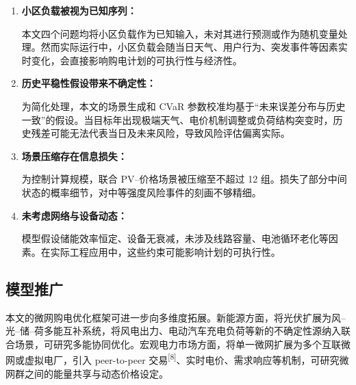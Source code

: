 \documentclass[withoutpreface,bwprint]{cumcmthesis} %
\begin{document}
\begin{enumerate}
    \item \textbf{小区负载被视为已知序列：}
    
    \hspace{2em}本文四个问题均将小区负载作为已知输入，未对其进行预测或作为随机变量处理。然而实际运行中，小区负载会随当日天气、用户行为、突发事件等因素实时变化，会直接影响购电计划的可执行性与经济性。

    \item \textbf{历史平稳性假设带来不确定性：}
    
    \hspace{2em}为简化处理，本文的场景生成和 CVaR 参数校准均基于“未来误差分布与历史一致”的假设。当目标年出现极端天气、电价机制调整或负荷结构突变时，历史残差可能无法代表当日及未来风险，导致风险评估偏离实际。

    \item \textbf{场景压缩存在信息损失：}
    
    \hspace{2em}为控制计算规模，联合 PV--价格场景被压缩至不超过 12 组。损失了部分中间状态的概率细节，对中等强度风险事件的刻画不够精细。

    \item \textbf{未考虑网络与设备动态：}
    
    \hspace{2em}模型假设储能效率恒定、设备无衰减，未涉及线路容量、电池循环老化等因素。在实际工程应用中，这些约束可能影响计划的可执行性。
    
\end{enumerate}


\subsection{模型推广}

本文的微网购电优化框架可进一步向多维度拓展。新能源方面，将光伏扩展为风--光--储--荷多能互补系统，将风电出力、电动汽车充电负荷等新的不确定性源纳入联合场景，可研究多能协同优化。宏观电力市场方面，将单一微网扩展为多个互联微网或虚拟电厂，引入 peer-to-peer 交易\textsuperscript{[8]}、实时电价、需求响应等机制，可研究微网群之间的能量共享与动态价格设定。






\newpage
\end{document}
